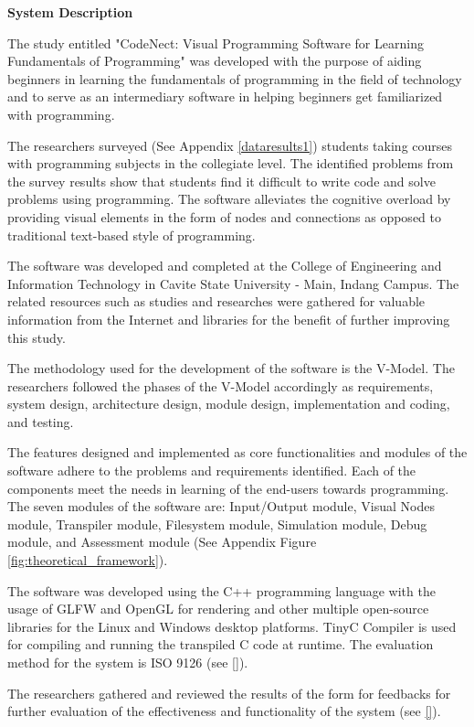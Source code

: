 \flushleft
\textbf{System Description}
\justifying

\parx
The study entitled "CodeNect: Visual Programming Software for Learning
Fundamentals of Programming" was developed with the purpose of aiding beginners
in learning the fundamentals of programming in the field of technology and to serve
as an intermediary software in helping beginners get familiarized with programming.

\parx
The researchers surveyed (See Appendix \ref{dataresults1}) students taking courses with
programming subjects in the collegiate level. The identified problems from the
survey results show that students find it difficult to write code and solve
problems using programming. The software alleviates the cognitive overload by
providing visual elements in the form of nodes and connections as opposed to
traditional text-based style of programming.

\parx
The software was developed and completed at the College of Engineering and
Information Technology in Cavite State University - Main, Indang Campus. The
related resources such as studies and researches were gathered for valuable
information from the Internet and libraries for the benefit of further improving
this study.

\parx
The methodology used for the development of the software is the V-Model. The
researchers followed the phases of the V-Model accordingly as requirements,
system design, architecture design, module design, implementation and coding,
and testing.

\parx
The features designed and implemented as core functionalities and modules of the
software adhere to the problems and requirements identified. Each of the components
meet the needs in learning of the end-users towards programming. The seven modules
of the software are: Input/Output module, Visual Nodes module, Transpiler module,
Filesystem module, Simulation module, Debug module, and Assessment module
(See Appendix Figure \ref{fig:theoretical_framework}).

\parx
The software was developed using the C++ programming language with the usage of
GLFW and OpenGL for rendering and other multiple open-source libraries for the
Linux and Windows desktop platforms. TinyC Compiler is used for compiling and running
the transpiled C code at runtime. The evaluation method for the system is ISO 9126
(see \ref{}).

\parx
The researchers gathered and reviewed the results of the form for feedbacks for
further evaluation of the effectiveness and functionality of the system (see \ref{}).
